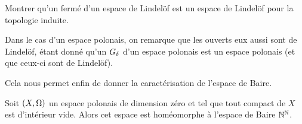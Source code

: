 \begin{exercise}
  Montrer qu'un fermé d'un espace de Lindelöf est un espace de Lindelöf pour la
  topologie induite.
\end{exercise}

\begin{remark}
  Dans le cas d'un espace polonais, on remarque que les ouverts eux aussi sont
  de Lindelöf, étant donné qu'un $G_{\delta}$ d'un espace polonais est un
  espace polonais (et que ceux-ci sont de Lindelöf).
\end{remark}

\noindent
Cela nous permet enfin de donner la caractérisation de l'espace de Baire.

\begin{theorem}
  Soit $(X,\Omega)$ un espace polonais de dimension zéro et tel que tout compact
  de $X$ est d'intérieur vide. Alors cet espace est homéomorphe à l'espace de
  Baire $\mathbb N^\mathbb N$.
\end{theorem}

